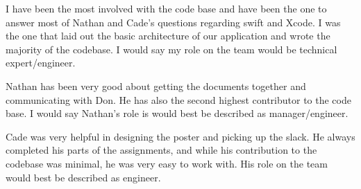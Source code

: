 \documentclass[onecolumn, draftclsnofoot,10pt, compsoc]{IEEEtran}
\begin{document}
I have been the most involved with the code base and have been the one to answer most of Nathan and Cade’s questions regarding swift and Xcode.
I was the one that laid out the basic architecture of our application and wrote the majority of the codebase.
I would say my role on the team would be technical expert/engineer.

Nathan has been very good about getting the documents together and communicating with Don.
He has also the second highest contributor to the code base.
I would say Nathan’s role is would best be described as manager/engineer.

Cade was very helpful in designing the poster and picking up the slack.
He always completed his parts of the assignments, and while his contribution to the codebase was minimal, he was very easy to work with.
His role on the team would best be described as engineer.


\newpage


\end{document}
